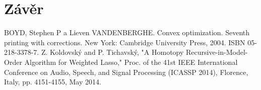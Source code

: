 \documentclass[FM,BP]{tulthesis}
\begin{document}
\chapter{Závěr}
\label{ch:end}

\renewcommand{\bibname}{Seznam použité literatury}
\begin{thebibliography}{99}
 BOYD, Stephen P a Lieven VANDENBERGHE. Convex optimization. Seventh printing with corrections. New York: Cambridge University Press, 2004. ISBN 05-218-3378-7.
Z. Koldovský and P. Tichavský, "A Homotopy Recursive-in-Model-Order Algorithm for Weighted Lasso," Proc. of the 41st IEEE International Conference on Audio, Speech, and Signal Processing (ICASSP 2014), Florence, Italy, pp. 4151-4155, May 2014.
\end{thebibliography}
\clearpage
\appendix
\end{document}
